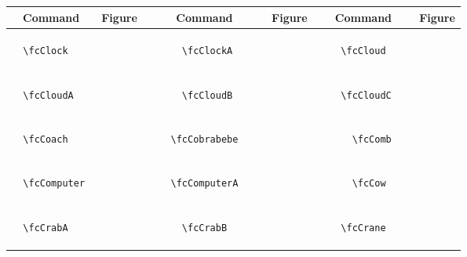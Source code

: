 \documentclass[x11names]{article}
\begin{document}
\begin{table}[H]\centering\begin{tabular}{|c|c|c|c|c|c|}\hline{\bf Command} & {\bf Figure} & {\bf Command} & {\bf Figure} & {\bf Command} & {\bf Figure}\\	\hline	&\multirow{5}{*}{	\fcClock	[scale=0.4]} & &\multirow{5}{*}{	\fcClockA	[scale=0.4]} & &\multirow{5}{*}{	\fcCloud	[scale=0.8]}\\	& & & & & \\	& & & & & \\	\verb|	\fcClock	| & & \verb|	\fcClockA	| & & \verb|	\fcCloud	| & \\	& & & & & \\	& & & & & \\	& & & & & \\	\hline									
		&\multirow{5}{*}{	\fcCloudA	[scale=0.4]} & &\multirow{5}{*}{	\fcCloudB	[scale=0.4]} & &\multirow{5}{*}{	\fcCloudC	[scale=0.4]}\\	& & & & & \\	& & & & & \\	\verb|	\fcCloudA	| & & \verb|	\fcCloudB	| & & \verb|	\fcCloudC	| & \\	& & & & & \\	& & & & & \\	& & & & & \\	\hline									
		&\multirow{5}{*}{	\fcCoach	[scale=0.4]} & &\multirow{5}{*}{	\fcCobrabebe	[scale=0.4]} & &\multirow{5}{*}{	\fcComb	[scale=0.4]}\\	& & & & & \\	& & & & & \\	\verb|	\fcCoach	| & & \verb|	\fcCobrabebe	| & & \verb|	\fcComb	| & \\	& & & & & \\	& & & & & \\	& & & & & \\	\hline									
		&\multirow{5}{*}{	\fcComputer	[scale=0.4]} & &\multirow{5}{*}{	\fcComputerA	[scale=0.4]} & &\multirow{5}{*}{	\fcCow	[scale=0.8]}\\	& & & & & \\	& & & & & \\	\verb|	\fcComputer	| & & \verb|	\fcComputerA	| & & \verb|	\fcCow	| & \\	& & & & & \\	& & & & & \\	& & & & & \\	\hline									
		&\multirow{5}{*}{	\fcCrabA	[scale=0.4]} & &\multirow{5}{*}{	\fcCrabB	[scale=0.4]} & &\multirow{5}{*}{	\fcCrane	[scale=0.4]}\\	& & & & & \\	& & & & & \\	\verb|	\fcCrabA	| & & \verb|	\fcCrabB	| & & \verb|	\fcCrane	| & \\	& & & & & \\	& & & & & \\	& & & & & \\	\hline									

\end{tabular}
\end{table}
\end{document}
